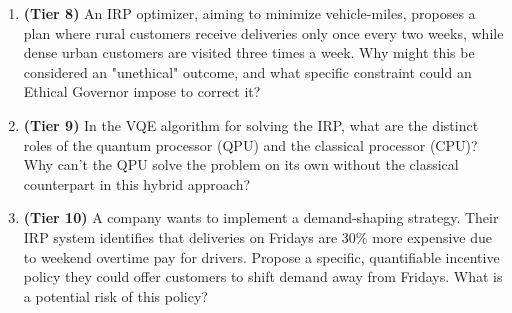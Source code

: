 \documentclass{article}
\begin{document}
\begin{enumerate}[label=\textbf{Q\arabic*:}, wide, labelindent=0pt]
    \item \textbf{(Tier 8)} An IRP optimizer, aiming to minimize vehicle-miles, proposes a plan where rural customers receive deliveries only once every two weeks, while dense urban customers are visited three times a week. Why might this be considered an "unethical" outcome, and what specific constraint could an Ethical Governor impose to correct it?
    
    \item \textbf{(Tier 9)} In the VQE algorithm for solving the IRP, what are the distinct roles of the quantum processor (QPU) and the classical processor (CPU)? Why can't the QPU solve the problem on its own without the classical counterpart in this hybrid approach?

    \item \textbf{(Tier 10)} A company wants to implement a demand-shaping strategy. Their IRP system identifies that deliveries on Fridays are 30\% more expensive due to weekend overtime pay for drivers. Propose a specific, quantifiable incentive policy they could offer customers to shift demand away from Fridays. What is a potential risk of this policy?

\end{enumerate}
\end{document}
